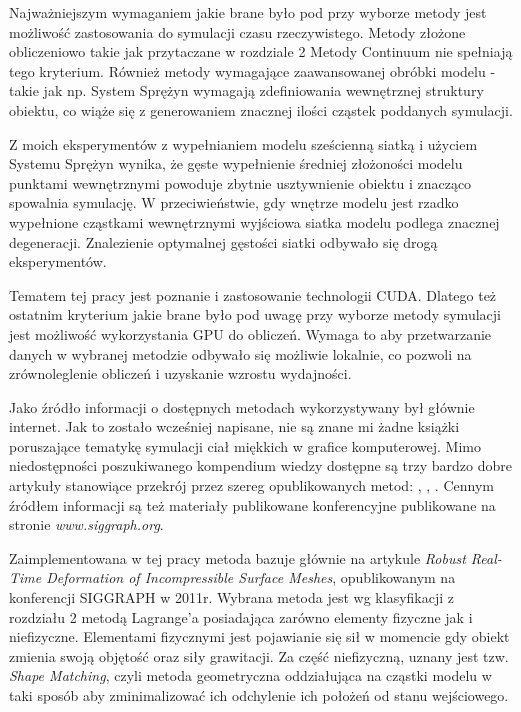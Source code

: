 Najważniejszym wymaganiem jakie brane było pod przy wyborze metody jest możliwość
zastosowania do symulacji czasu rzeczywistego. Metody złożone obliczeniowo takie
jak przytaczane w rozdziale 2 Metody Continuum nie spełniają tego kryterium.
Również metody wymagające zaawansowanej obróbki modelu - takie jak np. System
Sprężyn wymagają zdefiniowania wewnętrznej struktury obiektu, co wiąże się z
generowaniem znacznej ilości cząstek poddanych symulacji. 

Z moich eksperymentów z wypełnianiem modelu sześcienną siatką i użyciem Systemu Sprężyn wynika, że
gęste wypełnienie średniej złożoności modelu punktami wewnętrznymi powoduje
zbytnie usztywnienie obiektu i znacząco spowalnia symulację. W przeciwieństwie,
gdy wnętrze modelu jest rzadko wypełnione cząstkami wewnętrznymi wyjściowa
siatka modelu podlega znacznej degeneracji. Znalezienie optymalnej gęstości
siatki odbywało się drogą eksperymentów.

Tematem tej pracy jest poznanie i zastosowanie technologii CUDA. Dlatego też
ostatnim kryterium jakie brane było pod uwagę przy wyborze metody symulacji jest
możliwość wykorzystania GPU do obliczeń. Wymaga to aby
przetwarzanie danych w wybranej metodzie odbywało się możliwie lokalnie, co
pozwoli na zrównoleglenie obliczeń i uzyskanie wzrostu wydajności.

Jako źródło informacji o dostępnych metodach wykorzystywany był głównie
internet. Jak to zostało wcześniej napisane, nie są znane mi żadne książki
poruszające tematykę symulacji ciał miękkich w grafice komputerowej. Mimo
niedostępności poszukiwanego kompendium wiedzy dostępne są trzy bardzo dobre
artykuły stanowiące przekrój przez szereg opublikowanych metod: \cite{TR97-19},
	\cite{pbdo}, \cite{survey}. Cennym źródłem informacji są też materiały
	publikowane konferencyjne publikowane na stronie \textit{www.siggraph.org}.

Zaimplementowana w tej pracy metoda bazuje głównie na artykule \textit{Robust
	Real-Time Deformation of Incompressible Surface Meshes}\cite{diziol},
opublikowanym na konferencji SIGGRAPH w 2011r. Wybrana metoda jest wg
klasyfikacji z rozdziału 2 metodą Lagrange'a posiadająca zarówno elementy
fizyczne jak i niefizyczne. Elementami fizycznymi jest pojawianie się sił w
momencie gdy obiekt zmienia swoją objętość oraz siły grawitacji. Za część
niefizyczną, uznany jest tzw. \textit{Shape Matching}, czyli metoda geometryczna
oddziałująca na cząstki modelu w taki sposób aby zminimalizować ich odchylenie
ich położeń od stanu wejściowego.

